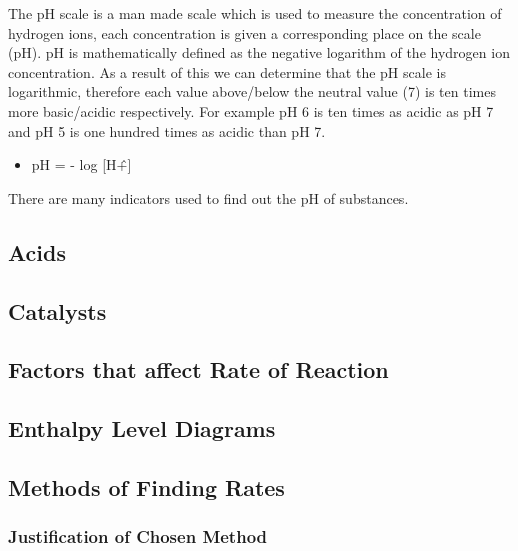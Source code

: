 The pH scale is a man made scale which is used to measure the concentration of hydrogen ions, each concentration is given a corresponding place on the scale (pH). pH is mathematically defined as the negative logarithm of the hydrogen ion concentration. As a result of this we can determine that the pH scale is logarithmic, therefore each value above/below the neutral value (7) is ten times more basic/acidic respectively. For example pH 6 is ten times as acidic as pH 7  and pH 5 is one hundred times as acidic than pH 7.

\begin{itemize}
\item pH = - log [H\^+]
\end{itemize}

There are many indicators used to find out the pH of substances.



	\subsection{Acids}



	\subsection{Catalysts}




	\subsection{Factors that affect Rate of Reaction}



	\subsection{Enthalpy Level Diagrams}	



	\subsection{Methods of Finding Rates}



		\subsubsection{Justification of Chosen Method}



